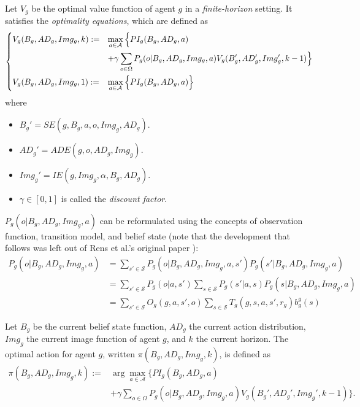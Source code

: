 \begin{definition} 
\label{def:optipo}
Let $V_g$ be the optimal value function of agent $g$ in a \textit{finite-horizon} setting. It satisfies the \textit{optimality equations}, which are defined as 
    \begin{align*}
        \begin{dcases}
            V_g(B_g, AD_g, Img_g, k) := &\max_{a \in \mathcal{A}} \Big\{ PI_g(B_g,AD_g,a) \\&+ \gamma \sum_{o \in \Omega} P_g(o | B_g, AD_g, Img_g, a) V_g(B_g', AD_g', Img_g', k-1) \Big\}  
            \\
            V_g(B_g, AD_g, Img_g, 1) := &\max_{a \in \mathcal{A}} \Big\{ PI_g(B_g,AD_g,a) \Big\} 
        \end{dcases}
    \end{align*}
    where
    \begin{itemize}
        \item $B_g' = SE(g, B_g, a, o, Img_g, AD_g)$.
        \item $AD_g' = ADE(g, o, AD_g, Img_g)$.
        \item $Img_g' = IE(g, Img_g, \alpha, B_g, AD_g)$.
        \item $\gamma \in [0,1]$ is called the \textit{discount factor}.
        \end{itemize} 
        
        $P_g(o | B_g, AD_g, Img_g, a)$ can be reformulated using the concepts of observation function, transition model, and belief state (note that the development that follows was left out of Rens et al.'s original paper \cite{rensetal}):
        \begin{align*}
         P_g(o | B_g, AD_g, Img_g, a) &= \sum_{s' \in \mathcal{S}} P_g(o | B_g, AD_g, Img_g, a, s') P_g(s' | B_g, AD_g, Img_g, a)
    \\
    &= \sum_{s' \in \mathcal{S}} P_g(o | a, s') \sum_{s \in \mathcal{S}} P_g(s' | a, s) P_g(s | B_g, AD_g, Img_g, a)
    \\
    &= \sum_{s' \in \mathcal{S}} O_g(g,a, s', o) \sum_{s \in \mathcal{S}} T_g(g, s, a, s',r_g) b_g^g(s)
    \end{align*}



    
\end{definition}
\begin{definition}
Let $B_g$ be the current belief state function, $AD_g$ the current action distribution, $Img_g$ the current image function of agent $g$, and $k$ the current horizon. The optimal action for agent $g$, written $\pi(B_g, AD_g, Img_g, k)$, is defined as
\begin{align*}
    \pi(B_g, AD_g, Img_g, k) := &\arg \max_{a \in \mathcal{A}} \Big\{ PI_g(B_g,AD_g,a) \\&+ \gamma \sum_{o \in \Omega} P_g(o | B_g, AD_g, Img_g, a) V_g(B_g', AD_g', Img_g', k-1) \Big\}.
\end{align*}
\end{definition}
